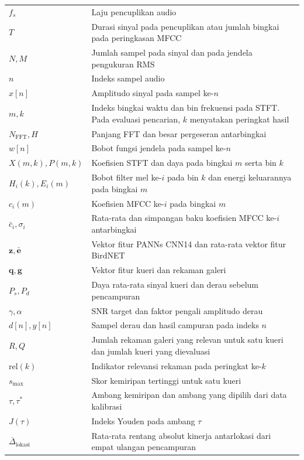 \begingroup
{}
\setlength{\LTpre}{0pt}
\setlength{\LTpost}{0pt}
\begin{longtable}{@{}p{3.4cm}p{\dimexpr\linewidth-3.4cm-2\tabcolsep\relax}@{}}
  $f_s$ & Laju pencuplikan audio\\
  $T$ & Durasi sinyal pada pencuplikan atau jumlah bingkai pada peringkasan MFCC\\
  $N, M$ & Jumlah sampel pada sinyal dan pada jendela pengukuran RMS\\
  $n$ & Indeks sampel audio\\
  $x[n]$ & Amplitudo sinyal pada sampel ke-$n$\\
  $m,k$ & Indeks bingkai waktu dan bin frekuensi pada STFT. Pada evaluasi pencarian, $k$ menyatakan peringkat hasil\\
  $N_{\mathrm{FFT}}, H$ & Panjang FFT dan besar pergeseran antarbingkai\\
  $w[n]$ & Bobot fungsi jendela pada sampel ke-$n$\\
  $X(m,k), P(m,k)$ & Koefisien STFT dan daya pada bingkai $m$ serta bin $k$\\
  $H_i(k), E_i(m)$ & Bobot filter mel ke-$i$ pada bin $k$ dan energi keluarannya pada bingkai $m$\\
  $c_i(m)$ & Koefisien MFCC ke-$i$ pada bingkai $m$\\
  $\bar{c}_i, \sigma_i$ & Rata-rata dan simpangan baku koefisien MFCC ke-$i$ antarbingkai\\
  $\mathbf{z}, \bar{\mathbf{e}}$ & Vektor fitur PANNs CNN14 dan rata-rata vektor fitur BirdNET\\
  $\mathbf{q}, \mathbf{g}$ & Vektor fitur kueri dan rekaman galeri\\
  $P_s, P_d$ & Daya rata-rata sinyal kueri dan derau sebelum pencampuran\\
  $\gamma, \alpha$ & SNR target dan faktor pengali amplitudo derau\\
  $d[n],y[n]$ & Sampel derau dan hasil campuran pada indeks $n$\\
  $R,Q$ & Jumlah rekaman galeri yang relevan untuk satu kueri dan jumlah kueri yang dievaluasi\\
  $\mathrm{rel}(k)$ & Indikator relevansi rekaman pada peringkat ke-$k$\\
  $s_{\max}$ & Skor kemiripan tertinggi untuk satu kueri\\
  $\tau, \tau^*$ & Ambang kemiripan dan ambang yang dipilih dari data kalibrasi\\
  $J(\tau)$ & Indeks Youden pada ambang $\tau$\\
  $\overline{\Delta}_{\mathrm{lokasi}}$ & Rata-rata rentang absolut kinerja antarlokasi dari empat ulangan pencampuran\\
\end{longtable}
\endgroup
